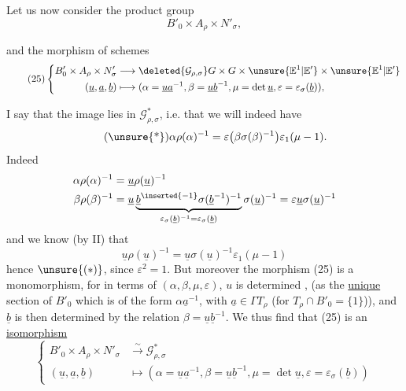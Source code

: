  Let us now consider the product group
\[
B'_0\times A_\rho\times N'_\sigma,
\]


and the morphism of schemes
\[
\tag{25}
\left\{\begin{aligned}
B'_0\times A_\rho\times N'_\sigma
&\longrightarrow \deleted{\mathcal G_{\rho,\sigma}}
 G\times G\times\unsure{\mathbb E^1|\mathbb E'}\times\unsure{\mathbb E^1|\mathbb E'}\\
(\underline u,\underline a,\underline b)
&\longmapsto
(\alpha=\underline u\underline a^{-1},\beta=\underline u\underline b^{-1},
\mu=\det\underline u,\varepsilon=\varepsilon_\sigma(\underline b)),
\end{aligned}\right.
\]

I say that the image lies in $\mathcal G^*_{\rho,\sigma}$, i.e.
that we will indeed have
\[
\tag{\unsure{*}}
\alpha\rho(\alpha)^{-1}
=\varepsilon\bigl(\beta\sigma(\beta)^{-1}\bigr)\varepsilon_1(\mu-1).
\]
Indeed
\[
\begin{aligned}
\alpha\rho(\alpha)^{-1}&=\underline u\rho(\underline u)^{-1}\\
\beta\rho(\beta)^{-1}
&=\underline u\underbrace{
\underline b^{\inserted{-1}}\sigma(\underline b^{-1})^{-1}
}_{\varepsilon_\sigma(\underline b)^{-1}=\varepsilon_\sigma(\underline b)}
\sigma(\underline u)^{-1}
=\varepsilon\underline u\sigma(\underline u)^{-1}
\end{aligned}
\]
and we know (by II) that
\[
\underline u\rho(\underline u)^{-1}
=\underline u\sigma(\underline u)^{-1}\varepsilon_1(\mu-1)
\]
hence $\unsure{(*)}$, since $\varepsilon^2=1$. But
moreover the morphism (25) is a monomorphism, 
for in terms of $(\alpha,\beta,\mu,\varepsilon)$, $u$ is determined
,
(as the \uline{unique} section of $B'_0$ which
is of the form $\alpha\underline a^{-1}$, with $\underline a\in\Gamma T_\rho$
(for $T_\rho\cap B'_0=\{1\}$)), and $\underline b$ is then determined
by the relation $\beta=\underline u\underline b^{-1}$. We thus find
that (25) is an \uline{isomorphism}
\[
\tag{26}
\left\{\begin{aligned}
B'_0\times A_\rho\times N'_\sigma
&\overset{\sim}{\longrightarrow}\mathcal G^*_{\rho,\sigma}\\
(\underline u,\underline a,\underline b)
&\longmapsto
(\alpha=\underline u\underline a^{-1},\beta=\underline u\underline b^{-1},
\mu=\det\underline u,\varepsilon=\varepsilon_\sigma(\underline b))
\end{aligned}\right.
\]

